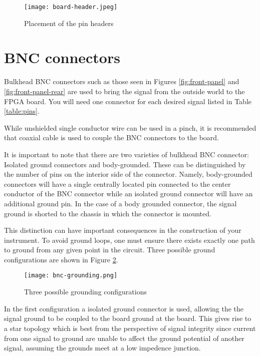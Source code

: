 \begin{figure}
  \center
  \texttt{[image: board-header.jpeg]}
  \caption{Placement of the pin headers}
  \label{fig:header}
\end{figure}

\section{BNC connectors}

Bulkhead BNC connectors such as those seen in Figures
\ref{fig:front-panel} and \ref{fig:front-panel-rear} are used to bring
the signal from the outside world to the FPGA board. You will need one
connector for each desired signal listed in Table \ref{table:pins}.

While unshielded single conductor wire can be used in a pinch, it is
recommended that coaxial cable is used to couple the BNC connectors to
the board.

It is important to note that there are two varieties of bulkhead BNC
connector: Isolated ground connectors and body-grounded. These can be
distinguished by the number of pins on the interior side of the
connector. Namely, body-grounded connectors will have a single
centrally located pin connected to the center conductor of the BNC
connector while an isolated ground connector will have an additional
ground pin. In the case of a body grounded connector, the signal
ground is shorted to the chassis in which the connector is mounted.

This distinction can have important consequences in the construction
of your instrument. To avoid ground loops, one must ensure there
exists exactly one path to ground from any given point in the circuit.
Three possible ground configurations are shown in Figure \ref{fig:grounding}.

\begin{figure}
  \center
  \texttt{[image: bnc-grounding.png]}
  \caption{Three possible grounding configurations}
  \label{fig:grounding}
\end{figure}

In the first configuration a isolated ground connector is used,
allowing the the signal ground to be coupled to the board ground
at the board. This gives rise to a star topology which is best
from the perspective of signal integrity since current from one signal
to ground are unable to affect the ground potential of another signal,
assuming the grounds meet at a low impedence junction.


